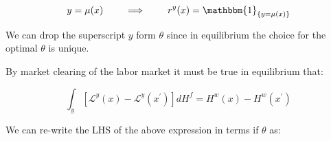 \documentclass[12pt]{article}
\theoremstyle{definition}
\newcommand{\qiq}{\qquad \implies \qquad}
\begin{document}

\begin{align*}
    y = \mu(x) &\qquad \implies \qquad r^y(x) = \mathbbm{1}_{\{y=\mu(x)\}}\\
\end{align*}

We can drop the superscript $y$ form $\theta$ since in equilibrium the choice for the optimal $\theta$ is unique.

By market clearing of the labor market it must be true in equilibrium that:

\begin{equation}\label{mkt_clearing_eq}
\int_{y}\left[\mathcal{L}^{y}(x)-\mathcal{L}^{y}\left(x^{\prime}\right)\right] d H^{f} = H^{w}(x)-H^{w}\left(x^{\prime}\right)
\end{equation}

We can re-write the LHS of the above expression in terms if $\theta$ as:



\end{document}
